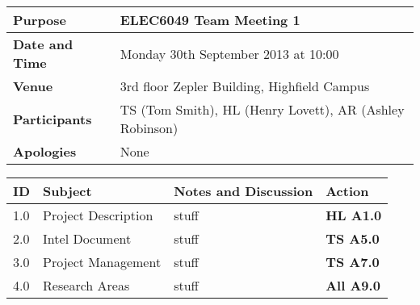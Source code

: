 \documentclass{elec6049Report}     %
\begin{document}

\clearpage

\begin{center}
\begin{longtable}{| m{} | m{} |} \hline
\textbf{Purpose} & ELEC6049 Team Meeting 1 \\ \hline
\textbf{Date and Time} & Monday 30th September 2013 at 10:00 \\ \hline
\endhead
\textbf{Venue} & 3rd floor Zepler Building, Highfield Campus \\ \hline
\textbf{Participants} & TS (Tom Smith), HL (Henry Lovett), AR (Ashley Robinson)\\ \hline
\textbf{Apologies} &None \\ \hline
\end{longtable}
\end{center}

\begin{center}
\begin{longtable}{| p{} |>{\raggedright\arraybackslash}p{} | p{} |>{\raggedright\arraybackslash}p{}|} \hline
\textbf{ID} & \textbf{Subject} & \textbf{Notes and Discussion} & \textbf{Action} \\ \hline
\endhead
1.0	&	Project Description	&	stuff	&	\textbf{HL A1.0} \\ \hline
2.0	&	Intel Document	&	stuff	&	\textbf{TS A5.0} \\ \hline
3.0	&	Project Management	&	stuff &	\textbf{TS A7.0} \\ \hline
4.0	&	Research Areas	&	stuff &	\textbf{All A9.0} \\ \hline


\end{longtable}
\end{center}
\end{document}
